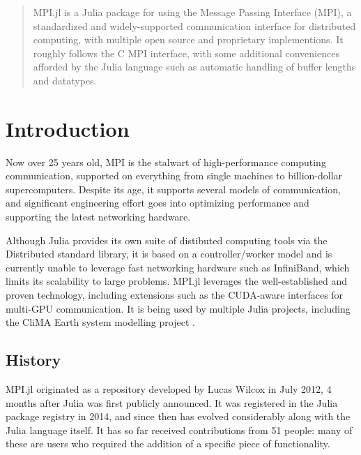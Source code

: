 \documentclass{juliacon}
\begin{document}


\maketitle

\begin{abstract}

MPI.jl is a Julia package for using the Message Passing Interface (MPI),
a standardized and widely-supported communication interface for
distributed computing, with multiple open source and proprietary
implementions. It roughly follows the C MPI interface, with some
additional conveniences afforded by the Julia language such as automatic
handling of buffer lengths and datatypes.

\end{abstract}

\section{Introduction}

Now over 25 years old, MPI is the stalwart of high-performance computing
communication, supported on everything from single machines to
billion-dollar supercomputers. Despite its age, it supports several
models of communication, and significant engineering effort goes into
optimizing performance and supporting the latest networking hardware.

Although Julia provides its own suite of distibuted computing tools via
the Distributed standard library, it is based on a controller/worker
model and is currently unable to leverage fast networking hardware such
as InfiniBand, which limits its scalability to large problems. MPI.jl
leverages the well-established and proven technology, including
extensions such as the CUDA-aware interfaces for multi-GPU
communication. It is being used by multiple Julia projects, including
the CliMA Earth system modelling project \cite{clima}.

\subsection{History}

MPI.jl originated as a repository developed by Lucas Wilcox in July 2012, 4 months after
Julia was first publicly announced. It was registered in the Julia package registry in
2014, and since then has evolved considerably along with the Julia language itself. It has
so far received contributions from 51 people: many of these are users who required the
addition of a specific piece of functionality.
\end{document}

